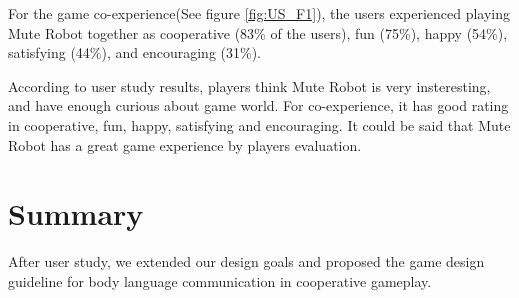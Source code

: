\documentclass{sigchi}
\begin{document}
For the game co-experience(See figure \ref{fig:US_F1}), the users experienced playing Mute Robot together as cooperative (83\% of the users), fun (75\%), happy (54\%), satisfying (44\%), and encouraging (31\%). 


According to user study results, players think Mute Robot is very insteresting, and have enough curious about game world. For co-experience, it has good rating in cooperative, fun, happy, satisfying and encouraging. It could be said that Mute Robot has a great game experience by players evaluation. 


\section{Summary}

After user study, we extended our design goals and proposed the game design guideline for body language communication in cooperative gameplay.
\end{document}
